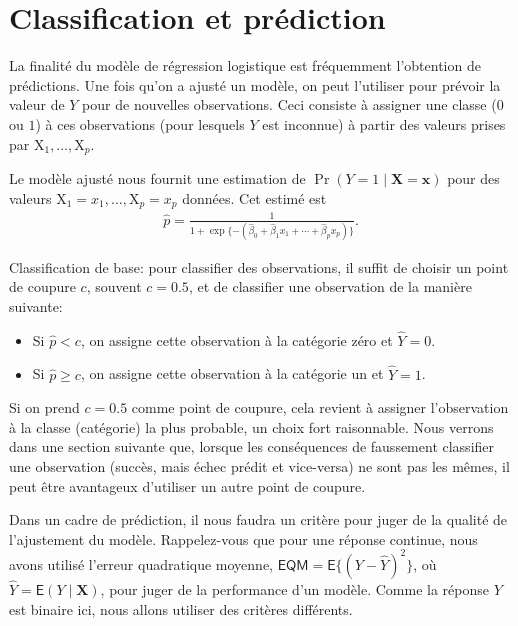 \documentclass[
  11pt,
  letterpaper,
]{scrbook}
\providecommand{\tightlist}{%
  \setlength{\itemsep}{0pt}\setlength{\parskip}{0pt}}\usepackage{longtable,booktabs,array}
\theoremstyle{definition}
\theoremstyle{remark}
\begin{document}
\hypertarget{classification-et-pruxe9diction}{%
\section{Classification et
prédiction}\label{classification-et-pruxe9diction}}

La finalité du modèle de régression logistique est fréquemment
l'obtention de prédictions. Une fois qu'on a ajusté un modèle, on peut
l'utiliser pour prévoir la valeur de \(Y\) pour de nouvelles
observations. Ceci consiste à assigner une classe (\(0\) ou \(1\)) à ces
observations (pour lesquels \(Y\) est inconnue) à partir des valeurs
prises par \(\mathrm{X}_1, \ldots, \mathrm{X}_p\).

Le modèle ajusté nous fournit une estimation de
\(\Pr(Y=1 \mid \mathbf{X}=\boldsymbol{x})\) pour des valeurs
\(\mathrm{X}_1=x_1, \ldots, \mathrm{X}_p=x_p\) données. Cet estimé est
\begin{align*}
 \widehat{p} = \frac{1}{1+ \exp\{- ( \widehat{\beta}_0 + \widehat{\beta}_1x_1 + \cdots + \widehat{\beta}_p x_p)\}}.
\end{align*}

Classification de base: pour classifier des observations, il suffit de
choisir un point de coupure \(c\), souvent \(c=0.5\), et de classifier
une observation de la manière suivante:

\begin{itemize}
\tightlist
\item
  Si \(\widehat{p} < c\), on assigne cette observation à la catégorie
  zéro et \(\widehat{Y}=0\).
\item
  Si \(\widehat{p} \geq c\), on assigne cette observation à la catégorie
  un et \(\widehat{Y}=1\).
\end{itemize}

Si on prend \(c=0.5\) comme point de coupure, cela revient à assigner
l'observation à la classe (catégorie) la plus probable, un choix fort
raisonnable. Nous verrons dans une section suivante que, lorsque les
conséquences de faussement classifier une observation (succès, mais
échec prédit et vice-versa) ne sont pas les mêmes, il peut être
avantageux d'utiliser un autre point de coupure.

Dans un cadre de prédiction, il nous faudra un critère pour juger de la
qualité de l'ajustement du modèle. Rappelez-vous que pour une réponse
continue, nous avons utilisé l'erreur quadratique moyenne,
\(\mathsf{EQM} = \mathsf{E}\{(Y-\widehat{Y})^2\}\), où
\(\widehat{Y} = \mathsf{E}(Y \mid \mathbf{X})\), pour juger de la
performance d'un modèle. Comme la réponse \(Y\) est binaire ici, nous
allons utiliser des critères différents.
\end{document}
